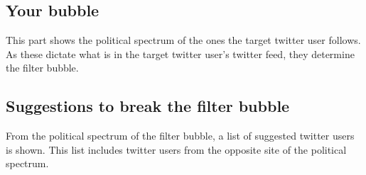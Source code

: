 \subsection*{Your bubble}
This part shows the political spectrum of the ones the target twitter user
follows. As these dictate what is in the target twitter user's twitter feed,
they determine the filter bubble.
 \subsection*{Suggestions to break the filter bubble}
 From the political spectrum of the filter bubble, a list of suggested twitter
 users is shown. This list includes twitter users from the opposite site of the
 political spectrum.

